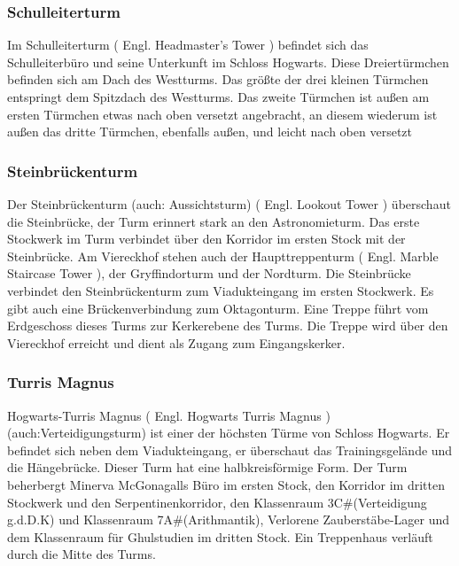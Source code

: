 \documentclass[a4paper, 10pt]{article}
\begin{document}
\subsubsection*{\large Schulleiterturm}
Im Schulleiterturm (  Engl.  Headmaster's Tower ) befindet sich das Schulleiterbüro und seine Unterkunft im Schloss Hogwarts. Diese Dreiertürmchen befinden sich am Dach des Westturms.
\vspace{10pt}
\newline
{}  
Das größte der drei kleinen Türmchen entspringt dem Spitzdach des Westturms. Das zweite Türmchen ist außen am ersten Türmchen etwas nach oben versetzt angebracht, an diesem wiederum ist außen das dritte Türmchen, ebenfalls außen, und leicht nach oben versetzt
\subsubsection*{\large Steinbrückenturm}
Der Steinbrückenturm (auch: Aussichtsturm) (  Engl.  Lookout Tower ) überschaut die Steinbrücke, der Turm erinnert stark an den Astronomieturm. Das erste Stockwerk im Turm verbindet über den Korridor im ersten Stock mit der Steinbrücke.
\vspace{10pt}
\newline
{}  
Am Viereckhof stehen auch der Haupttreppenturm (  Engl.  Marble Staircase Tower ), der Gryffindorturm und der Nordturm. Die Steinbrücke verbindet den Steinbrückenturm zum Viadukteingang im ersten Stockwerk. Es gibt auch eine Brückenverbindung zum Oktagonturm.
\vspace{10pt}
\newline
{}  
Eine Treppe führt vom Erdgeschoss dieses Turms zur Kerkerebene des Turms. Die Treppe wird über den Viereckhof erreicht und dient als Zugang zum Eingangskerker.
\subsubsection*{\large Turris Magnus}
Hogwarts-Turris Magnus (  Engl.  Hogwarts Turris Magnus ) (auch:Verteidigungsturm) ist einer der höchsten Türme von Schloss Hogwarts. Er befindet sich neben dem Viadukteingang, er überschaut das Trainingsgelände und die Hängebrücke. Dieser Turm hat eine halbkreisförmige Form.
\vspace{10pt}
\newline
{}  
Der Turm beherbergt Minerva McGonagalls Büro im ersten Stock, den Korridor im dritten Stockwerk und den Serpentinenkorridor, den Klassenraum 3C#(Verteidigung g.d.D.K) und Klassenraum 7A#(Arithmantik), Verlorene Zauberstäbe-Lager und dem Klassenraum für Ghulstudien im dritten Stock. Ein Treppenhaus verläuft durch die Mitte des Turms.
\end{document}
